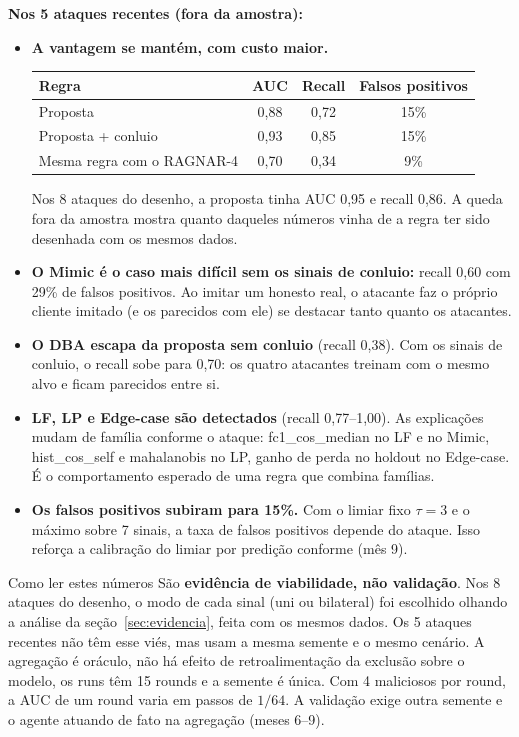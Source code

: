 \documentclass[11pt,a4paper]{article}
\begin{document}
\noindent\textbf{Nos 5 ataques recentes (fora da amostra):}
\begin{itemize}
  \item \textbf{A vantagem se mantém, com custo maior.}

        \begin{tabular}{lccc}
          \toprule
          Regra & AUC & Recall & Falsos positivos \\
          \midrule
          Proposta & 0,88 & 0,72 & 15\% \\
          Proposta + conluio & 0,93 & 0,85 & 15\% \\
          Mesma regra com o RAGNAR-4 & 0,70 & 0,34 & 9\% \\
          \bottomrule
        \end{tabular}

        Nos 8 ataques do desenho, a proposta tinha AUC 0,95 e recall 0,86. A queda fora da amostra
        mostra quanto daqueles números vinha de a regra ter sido desenhada com os mesmos dados.
  \item \textbf{O Mimic é o caso mais difícil sem os sinais de conluio:} recall 0,60 com 29\% de falsos
        positivos. Ao imitar um honesto real, o atacante faz o próprio cliente imitado (e os parecidos com
        ele) se destacar tanto quanto os atacantes.
  \item \textbf{O DBA escapa da proposta sem conluio} (recall 0,38). Com os sinais de conluio, o recall
        sobe para 0,70: os quatro atacantes treinam com o mesmo alvo e ficam parecidos entre si.
  \item \textbf{LF, LP e Edge-case são detectados} (recall 0,77--1,00). As explicações mudam de família
        conforme o ataque: fc1\_cos\_median no LF e no Mimic, hist\_cos\_self e mahalanobis no LP,
        ganho de perda no holdout no Edge-case. É o comportamento esperado de uma regra que combina
        famílias.
  \item \textbf{Os falsos positivos subiram para 15\%.} Com o limiar fixo $\tau = 3$ e o máximo sobre 7
        sinais, a taxa de falsos positivos depende do ataque. Isso reforça a calibração do limiar por
        predição conforme (mês 9).
\end{itemize}

\begin{alertbox}{Como ler estes números}
São \textbf{evidência de viabilidade, não validação}. Nos 8 ataques do desenho, o modo de cada sinal
(uni ou bilateral) foi escolhido olhando a análise da seção~\ref{sec:evidencia}, feita com os mesmos
dados. Os 5 ataques recentes não têm esse viés, mas usam a mesma semente e o mesmo cenário. A agregação é oráculo, não há
efeito de retroalimentação da exclusão sobre o modelo, os runs têm 15 rounds e a semente é única. Com 4
maliciosos por round, a AUC de um round varia em passos de $1/64$. A validação exige outra semente e o
agente atuando de fato na agregação (meses 6--9).
\end{alertbox}
\end{document}
